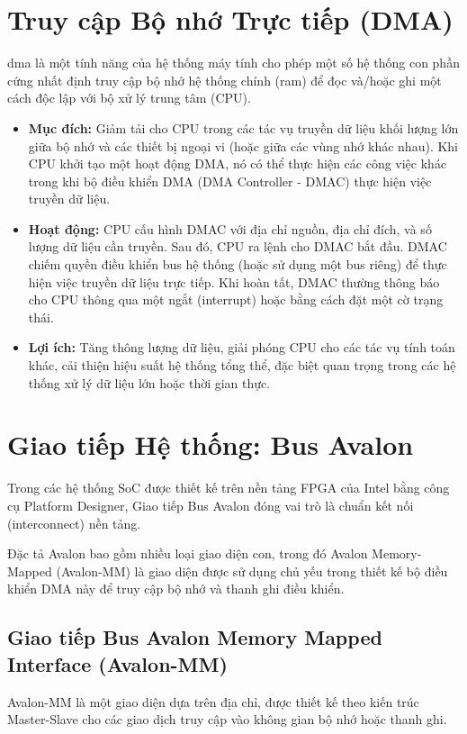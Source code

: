 \section{Truy cập Bộ nhớ Trực tiếp (DMA)}
\acrfull{dma} là một tính năng của hệ thống máy tính cho phép một số hệ thống con phần cứng nhất định truy cập bộ nhớ hệ thống chính (\acrshort{ram}) để đọc và/hoặc ghi một cách độc lập với bộ xử lý trung tâm (CPU).
\begin{itemize}
    \item \textbf{Mục đích:} Giảm tải cho CPU trong các tác vụ truyền dữ liệu khối lượng lớn giữa bộ nhớ và các thiết bị ngoại vi (hoặc giữa các vùng nhớ khác nhau). Khi CPU khởi tạo một hoạt động DMA, nó có thể thực hiện các công việc khác trong khi bộ điều khiển DMA (DMA Controller - DMAC) thực hiện việc truyền dữ liệu.
    \item \textbf{Hoạt động:} CPU cấu hình DMAC với địa chỉ nguồn, địa chỉ đích, và số lượng dữ liệu cần truyền. Sau đó, CPU ra lệnh cho DMAC bắt đầu. DMAC chiếm quyền điều khiển bus hệ thống (hoặc sử dụng một bus riêng) để thực hiện việc truyền dữ liệu trực tiếp. Khi hoàn tất, DMAC thường thông báo cho CPU thông qua một ngắt (interrupt) hoặc bằng cách đặt một cờ trạng thái.
    \item \textbf{Lợi ích:} Tăng thông lượng dữ liệu, giải phóng CPU cho các tác vụ tính toán khác, cải thiện hiệu suất hệ thống tổng thể, đặc biệt quan trọng trong các hệ thống xử lý dữ liệu lớn hoặc thời gian thực.
\end{itemize}

\section{Giao tiếp Hệ thống: Bus Avalon}
\label{sec:avalon_bus}
Trong các hệ thống SoC được thiết kế trên nền tảng FPGA của Intel bằng công cụ Platform Designer, Giao tiếp Bus Avalon đóng vai trò là chuẩn kết nối (interconnect) nền tảng. 

Đặc tả Avalon bao gồm nhiều loại giao diện con, trong đó Avalon Memory-Mapped (Avalon-MM) là giao diện được sử dụng chủ yếu trong thiết kế bộ điều khiển DMA này để truy cập bộ nhớ và thanh ghi điều khiển.

\FloatBarrier

\subsection{Giao tiếp Bus Avalon Memory Mapped Interface (Avalon-MM)}
Avalon-MM là một giao diện dựa trên địa chỉ, được thiết kế theo kiến trúc Master-Slave cho các giao dịch truy cập vào không gian bộ nhớ hoặc thanh ghi.

